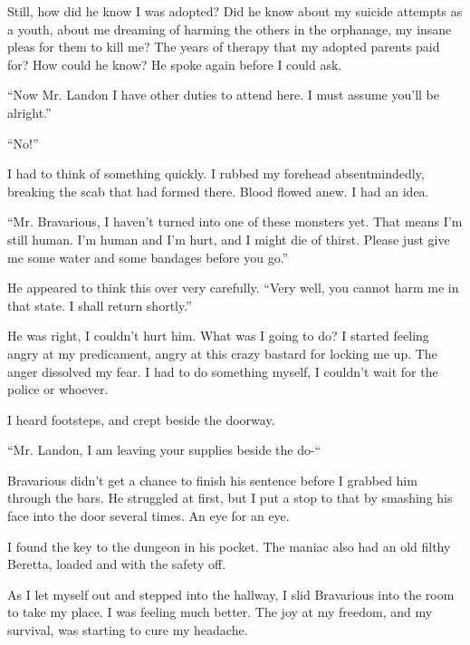 Still, how did he know I was adopted? Did he know about my suicide
attempts as a youth, about me dreaming of harming the others in the
orphanage, my insane pleas for them to kill me? The years of
therapy that my adopted parents paid for? How could he know? He
spoke again before I could ask.



``Now Mr. Landon I have other duties to attend here. I must
assume you'll be alright.''



``No!''



I had to think of something quickly. I rubbed my forehead
absentmindedly, breaking the scab that had formed there. Blood
flowed anew. I had an idea.



``Mr. Bravarious, I haven't turned into one of these
monsters yet. That means I'm still human. I'm human and
I'm hurt, and I might die of thirst. Please just give me some
water and some bandages before you go.''



He appeared to think this over very carefully. ``Very well,
you cannot harm me in that state. I shall return
shortly.''



He was right, I couldn't hurt him. What was I going to do? I
started feeling angry at my predicament, angry at this crazy
bastard for locking me up. The anger dissolved my fear. I had to do
something myself, I couldn't wait for the police or
whoever.



I heard footsteps, and crept beside the doorway.



``Mr. Landon, I am leaving your supplies beside the
do-``



Bravarious didn't get a chance to finish his sentence before
I grabbed him through the bars. He struggled at first, but I put a
stop to that by smashing his face into the door several times. An
eye for an eye.



I found the key to the dungeon in his pocket. The maniac also had
an old filthy Beretta, loaded and with the safety off.



As I let myself out and stepped into the hallway, I slid Bravarious
into the room to take my place. I was feeling much better. The joy
at my freedom, and my survival, was starting to cure my
headache.



